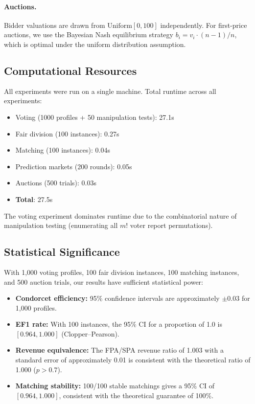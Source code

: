 \documentclass[10pt]{article}
\begin{document}
\paragraph{Auctions.}
Bidder valuations are drawn from $\text{Uniform}[0, 100]$ independently. For first-price auctions, we use the Bayesian Nash equilibrium strategy $b_i = v_i \cdot (n-1)/n$, which is optimal under the uniform distribution assumption.

\subsection{Computational Resources}

All experiments were run on a single machine. Total runtime across all experiments:
\begin{itemize}[leftmargin=*,itemsep=1pt]
  \item Voting (1000 profiles + 50 manipulation tests): 27.1s
  \item Fair division (100 instances): 0.27s
  \item Matching (100 instances): 0.04s
  \item Prediction markets (200 rounds): 0.05s
  \item Auctions (500 trials): 0.03s
  \item \textbf{Total}: 27.5s
\end{itemize}

The voting experiment dominates runtime due to the combinatorial nature of manipulation testing (enumerating all $m!$ voter report permutations).

\subsection{Statistical Significance}

With 1{,}000 voting profiles, 100 fair division instances, 100 matching instances, and 500 auction trials, our results have sufficient statistical power:

\begin{itemize}[leftmargin=*,itemsep=1pt]
  \item \textbf{Condorcet efficiency:} 95\% confidence intervals are approximately $\pm 0.03$ for 1{,}000 profiles.
  \item \textbf{EF1 rate:} With 100 instances, the 95\% CI for a proportion of 1.0 is $[0.964, 1.000]$ (Clopper--Pearson).
  \item \textbf{Revenue equivalence:} The FPA/SPA revenue ratio of 1.003 with a standard error of approximately 0.01 is consistent with the theoretical ratio of 1.000 ($p > 0.7$).
  \item \textbf{Matching stability:} 100/100 stable matchings gives a 95\% CI of $[0.964, 1.000]$, consistent with the theoretical guarantee of 100\%.
\end{itemize}
\end{document}
